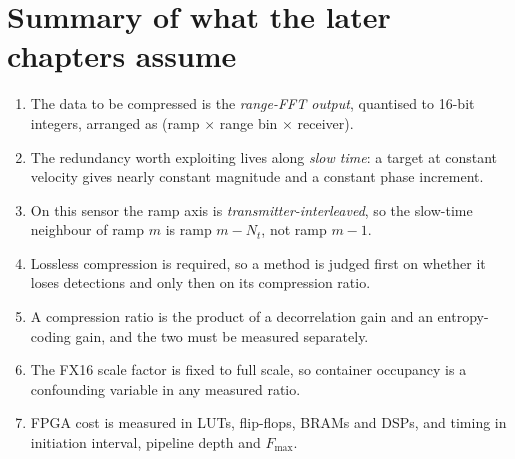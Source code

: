 \section{Summary of what the later chapters assume}

\begin{enumerate}
\item The data to be compressed is the \emph{range-FFT output}, quantised to
16-bit integers, arranged as (ramp $\times$ range bin $\times$ receiver).
\item The redundancy worth exploiting lives along \emph{slow time}: a target at
constant velocity gives nearly constant magnitude and a constant phase
increment.
\item On this sensor the ramp axis is \emph{transmitter-interleaved}, so the
slow-time neighbour of ramp $m$ is ramp $m - N_t$, not ramp $m-1$.
\item Lossless compression is required, so a method is judged first on whether
it loses detections and only then on its compression ratio.
\item A compression ratio is the product of a decorrelation gain and an
entropy-coding gain, and the two must be measured separately.
\item The FX16 scale factor is fixed to full scale, so container occupancy is a
confounding variable in any measured ratio.
\item FPGA cost is measured in LUTs, flip-flops, BRAMs and DSPs, and timing in
initiation interval, pipeline depth and $F_{\max}$.
\end{enumerate}

